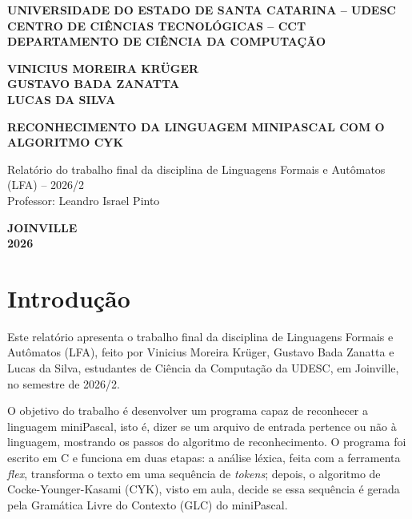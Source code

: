 \documentclass[12pt,a4paper]{article}
\newcommand{\miniPascal}{miniPascal}
\begin{document}
\begin{titlepage}
\begin{center}
\singlespacing
\textbf{UNIVERSIDADE DO ESTADO DE SANTA CATARINA -- UDESC}\\
\textbf{CENTRO DE CIÊNCIAS TECNOLÓGICAS -- CCT}\\
\textbf{DEPARTAMENTO DE CIÊNCIA DA COMPUTAÇÃO}

\vspace{4cm}
\textbf{VINICIUS MOREIRA KRÜGER}\\
\textbf{GUSTAVO BADA ZANATTA}\\
\textbf{LUCAS DA SILVA}

\vspace{4cm}
\textbf{RECONHECIMENTO DA LINGUAGEM MINIPASCAL COM O ALGORITMO CYK}

\vspace{0.6cm}
Relatório do trabalho final da disciplina de Linguagens Formais e Autômatos (LFA) -- 2026/2\\[2pt]
Professor: Leandro Israel Pinto

\vfill
\textbf{JOINVILLE}\\
\textbf{2026}
\end{center}
\end{titlepage}
\setcounter{page}{2}

\section{Introdução}

Este relatório apresenta o trabalho final da disciplina de Linguagens Formais e Autômatos (LFA),
feito por Vinicius Moreira Krüger, Gustavo Bada Zanatta e Lucas da Silva, estudantes de Ciência
da Computação da UDESC, em Joinville, no semestre de 2026/2.

O objetivo do trabalho é desenvolver um programa capaz de reconhecer a linguagem \miniPascal{},
isto é, dizer se um arquivo de entrada pertence ou não à linguagem, mostrando os passos do
algoritmo de reconhecimento. O programa foi escrito em C e funciona em duas etapas: a análise
léxica, feita com a ferramenta \textit{flex}, transforma o texto em uma sequência de
\textit{tokens}; depois, o algoritmo de Cocke-Younger-Kasami (CYK), visto em aula, decide se
essa sequência é gerada pela Gramática Livre do Contexto (GLC) do \miniPascal{}.
\end{document}
